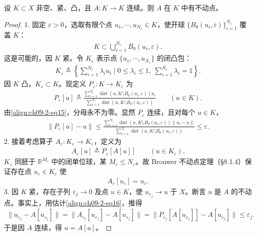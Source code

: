 \documentclass[../../main.tex]{subfiles}
\begin{document}
\begin{theorem}\label{theorem:ch09-2-3-Schauder}
设 $K\subset X$ 非空、紧、凸，且 $A:K\to K$ 连续。则 $A$ 在 $K$ 中有不动点。
\begin{proof}
1. 固定 $\varepsilon>0$，选取有限个点 $u_1,\cdots,u_{N_\varepsilon}\in K$，使开球 $\{B_0(u_i,\varepsilon)\}_{i=1}^{N_\varepsilon}$ 覆盖 $K$：
\begin{align}
K\subset\bigcup_{i=1}^{N_\varepsilon}B_0(u_i,\varepsilon).\label{align:ch09-2-eq15}
\end{align}
这是可能的，因 $K$ 紧。令 $K_\varepsilon$ 表示点 $\{u_1,\cdots,u_{N_\varepsilon}\}$ 的闭凸包：
\begin{align*}
K_\varepsilon\triangleq\left\{\sum_{i=1}^{N_\varepsilon}\lambda_i u_i\mid 0\leqslant\lambda_i\leqslant 1,\ \sum_{i=1}^{N_\varepsilon}\lambda_i=1\right\}.
\end{align*}
因 $K$ 凸，$K_\varepsilon\subset K$。现定义 $P_\varepsilon:K\to K_\varepsilon$ 为
\begin{align*}
P_\varepsilon[u]\triangleq\frac{\sum_{i=1}^{N_\varepsilon}\operatorname{dist}(u,K\setminus B_0(u_i,\varepsilon))u_i}{\sum_{i=1}^{N_\varepsilon}\operatorname{dist}(u,K\setminus B_0(u_i,\varepsilon))}\qquad (u\in K).
\end{align*}
由\eqref{align:ch09-2-eq15}，分母永不为零。显然 $P_\varepsilon$ 连续，且对每个 $u\in K$，
\begin{align}
\|P_\varepsilon[u]-u\|\leqslant\frac{\sum_{i=1}^{N_\varepsilon}\operatorname{dist}(u,K\setminus B_0(u_i,\varepsilon))\|u_i-u\|}{\sum_{i=1}^{N_\varepsilon}\operatorname{dist}(u,K\setminus B_0(u_i,\varepsilon))}\leqslant\varepsilon.\label{align:ch09-2-eq16}
\end{align}
2. 接着考虑算子 $A_\varepsilon:K_\varepsilon\to K_\varepsilon$，定义为
\begin{align*}
A_\varepsilon[u]\triangleq P_\varepsilon[A[u]]\qquad (u\in K_\varepsilon).
\end{align*}
$K_\varepsilon$ 同胚于 $\mathbb{R}^{M_\varepsilon}$ 中的闭单位球，某 $M_\varepsilon\leqslant N_\varepsilon$。故 Brouwer 不动点定理（\S8.1.4）保证存在点 $u_\varepsilon\in K_\varepsilon$ 使
\begin{align*}
A_\varepsilon[u_\varepsilon]=u_\varepsilon.
\end{align*}
3. 因 $K$ 紧，存在子列 $\varepsilon_j\to 0$ 及点 $u\in K$，使 $u_{\varepsilon_j}\to u$ 于 $X$。断言 $u$ 是 $A$ 的不动点。事实上，用估计\eqref{align:ch09-2-eq16}，推得
\begin{align*}
\|u_{\varepsilon_j}-A[u_{\varepsilon_j}]\|=\|A_{\varepsilon_j}[u_{\varepsilon_j}]-A[u_{\varepsilon_j}]\|=\|P_{\varepsilon_j}[A[u_{\varepsilon_j}]]-A[u_{\varepsilon_j}]\|\leqslant\varepsilon_j.
\end{align*}
于是因 $A$ 连续，得 $u=A[u]$。
\end{proof}
\end{theorem}
\end{document}
